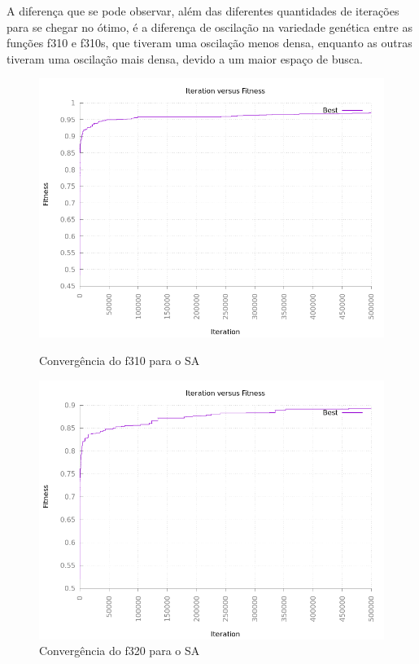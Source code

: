 \documentclass[12pt]{article}
\begin{document}
A diferença que se pode observar, além das diferentes quantidades de iterações para se 
chegar no ótimo, é a diferença de oscilação na variedade genética entre as funções 
f310 e f310s, que tiveram uma oscilação menos densa, enquanto as outras tiveram uma 
oscilação mais densa, devido a um maior espaço de busca.

\begin{figure}[h!]
    \centering
    \begin{minipage}{0.45\textwidth}
        \centering
        \includegraphics[width=\textwidth]{pictures/saf310}
        \caption{Convergência do f310 para o SA}
        \label{sa310}
    \end{minipage}
    \begin{minipage}{0.45\textwidth}
        \centering
        \includegraphics[width=\textwidth]{pictures/saf320}
        \caption{Convergência do f320 para o SA}
    \end{minipage}
\end{figure}
\end{document}

